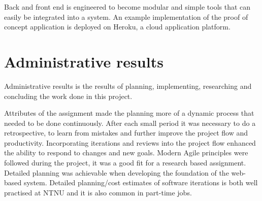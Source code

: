 Back and front end is engineered to become modular and simple tools that can easily be integrated into a system. An example implementation of the proof of concept application is deployed on Heroku, a cloud application platform.


\section{Administrative results} %
Administrative results is the results of planning, implementing, researching and concluding the work done in this project. 

Attributes of the assignment made the planning more of a dynamic process that needed to be done continuously. After each small period it was necessary to do a retrospective, to learn from mistakes and further improve the project flow and productivity. Incorporating iterations and reviews into the project flow enhanced the ability to respond to changes and new goals. Modern Agile principles were followed during the project, it was a good fit for a research based assignment. Detailed planning was achievable when developing the foundation of the web-based system. Detailed planning/cost estimates of software iterations is both well practised at NTNU and it is also common in part-time jobs. 

